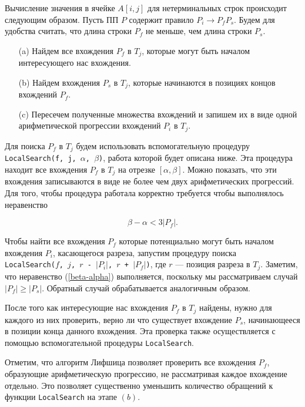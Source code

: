 \documentclass[14pt]{article}
\begin{document}
Вычисление значения в ячейке $A[i, j]$ для нетерминальных строк происходит следующим образом. Пусть ПП $P$ содержит правило 
$P_i \to P_f P_s$. Будем для удобства считать, что длина строки $P_f$ не меньше, чем длина строки $P_s$.  

\begin{itemize}
\item[(a)] Найдем все вхождения $P_f$ в $T_j$, которые могут быть началом интересующего нас вхождения.
\item[(b)] Найдем вхождения $P_s$ в $T_j$, которые начинаются в позициях концов вхождений $P_f$.
\item[(c)] Пересечем полученные множества вхождений и запишем их в виде одной арифметической прогрессии вхождений $P_i$ в $T_j$.
\end{itemize}

Для поиска $P_f$ в $T_j$ будем использовать вспомогательную процедуру\\
\texttt{LocalSearch(f, j, $\alpha$, $\beta$)}, работа которой будет описана ниже. 
Эта процедура находит все вхождения $P_f$ в $T_j$ на отрезке $[\alpha, \beta]$.
Можно показать, что эти вхождения записываются в виде не более чем двух арифметических прогрессий.
Для того, чтобы процедура работала корректно требуется чтобы выполнялось неравенство 

\begin{equation} \beta-\alpha < 3 |P_f|. \label{beta-alpha} \end{equation}
 
Чтобы найти все вхождения $P_f$ которые потенциально могут быть началом вхождения $P_i$, касающегося разреза,
запустим процедуру поиска\\
\texttt{LocalSearch($f$, $j$, $r$ - $|P_i|$, $r$ + $|P_f|$)}, где $r$ --- позиция разреза в $T_j$.
Заметим, что неравенство (\ref{beta-alpha}) выполняется, поскольку мы рассматриваем случай $|P_f| \geqslant |P_s|$.
Обратный случай обрабатывается аналогичным образом. 


После того как интересующие нас вхождения $P_f$ в $T_j$ найдены, нужно для каждого из них проверить, верно ли
что существует вхождение $P_s$, начинающееся в позиции конца данного вхождения. Эта проверка также осуществляется
с помощью вспомогательной процедуры \texttt{LocalSearch}.

Отметим, что алгоритм Лифшица позволяет проверить все вхождения $P_f$, образующие арифметическую прогрессию, не рассматривая
каждое вхождение отдельно. Это позволяет существенно уменьшить количество обращений к функции \texttt{LocalSearch} 
на этапе $(b)$.
\end{document}
